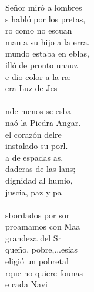 \begin{cancion}%
	 Señor miró a lombres\\
	s habló por los pretas,\\
	ro como no escuan\\
	man a su hijo a la erra. \\
	 mundo estaba en eblas,\\
	illó de pronto unauz\\
	e dio color a la ra:\\
	era  Luz de Jes\\
	    \\
	nde menos se esba\\
	naó la Piedra Angar.\\
	 el corazón delre\\
	 instalado su porl.\\
	a de espadas as,\\
	daderas de las lans;\\
	 dignidad al humio,\\
	juscia, paz y pa\\
	   \\
	sbordados por sor\\
	proamamos con Maa \\
	 grandeza del Sr\\
	queño, pobre,...esías\\
	eligió un pobretal\\
	rque no quiere founas\\
	e cada Navi\\

\end{cancion}
